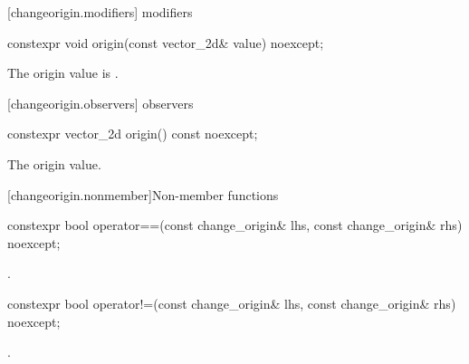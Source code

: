  [changeorigin.modifiers]{ modifiers}%

%
\begin{itemdecl}
constexpr void origin(const vector_2d& value) noexcept;
\end{itemdecl}
\begin{itemdescr}
\pnum
\effects
The origin value is .
\end{itemdescr}

 [changeorigin.observers]{ observers}

%
\begin{itemdecl}
constexpr vector_2d origin() const noexcept;
\end{itemdecl}
\begin{itemdescr}
\pnum
\returns
The origin value.
\end{itemdescr}

 [changeorigin.nonmember]{Non-member functions}%

%
\begin{itemdecl}
constexpr bool operator==(const change_origin& lhs, const change_origin& rhs) 
  noexcept;
\end{itemdecl}
\begin{itemdescr}
\pnum
\returns
{}.
\end{itemdescr}

%
\begin{itemdecl}
constexpr bool operator!=(const change_origin& lhs, const change_origin& rhs) 
  noexcept;
\end{itemdecl}
\begin{itemdescr}
\pnum
\returns
{}.
\end{itemdescr}
